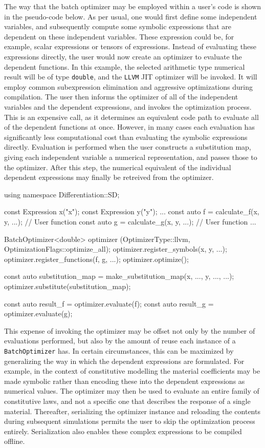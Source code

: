 \documentclass{ansarticle-preprint}
\begin{document}
The way that the batch optimizer may be employed within a user's code is shown
in the pseudo-code below.
As per usual, one would first define some independent variables, and 
subsequently compute some symbolic expressions that are dependent on these 
independent variables. 
These expression could be, for example, scalar  expressions or tensors of 
expressions.
Instead of evaluating these expressions directly, the user would now create an
optimizer to evaluate the dependent functions.
In this example, the selected arithmetic type numerical result will be of type
\texttt{double}, and the \texttt{LLVM} JIT optimizer will be invoked.
It will employ common subexpression elimination and aggressive optimizations
during compilation.
The user then informs the optimizer of all of the independent variables and the
dependent expressions, and invokes the optimization process.
This is an expensive call, as it determines an equivalent code path to evaluate
all of the dependent functions at once.
However, in many cases each evaluation has significantly less computational cost
than evaluating the symbolic expressions directly.
Evaluation is performed when the user constructs a substitution map, giving each
independent variable a numerical representation, and passes those to the 
optimizer.
After this step, the numerical equivalent of the individual dependent expressions
may finally be retreived from the optimizer.

\begin{c++}
using namespace Differentiation::SD;

const Expression x("x");
const Expression y("y");
...
const auto f = calculate_f(x, y, ...); // User function
const auto g = calculate_g(x, y, ...); // User function
...

BatchOptimizer<double> optimizer (OptimizerType::llvm,
                                  OptimizationFlags::optimize_all);
optimizer.register_symbols(x, y, ...);
optimizer.register_functions(f, g, ...);
optimizer.optimize();

const auto substitution_map
  = make_substitution_map({x, ...}, {y, ...}, ...);
optimizer.substitute(substitution_map);

const auto result_f = optimizer.evaluate(f);
const auto result_g = optimizer.evaluate(g);
\end{c++}

This expense of invoking the optimizer may be offset not only by
the number of evaluations performed, but also by the amount of reuse each
instance of a \texttt{BatchOptimizer} has.
In certain circumstances, this can be maximized by generalizing the way in which
the dependent expressions are formulated.
For example, in the context of constitutive modelling the material coefficients
may be made symbolic rather than encoding these into the dependent expressions
as numerical values.
The optimizer may then be used to evaluate an entire family of constitutive laws,
and not a specific one that describes the response of a single material.
Thereafter, serializing the optimizer instance and reloading the contents during
subsequent simulations permits the user to skip the optimization process entirely.
Serialization also enables these complex expressions to be compiled offline.
\end{document}
